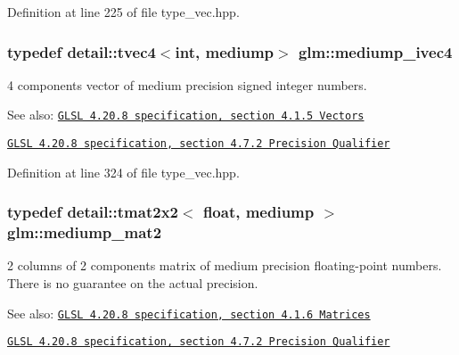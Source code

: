 Definition at line 225 of file type\_\-vec.hpp.\hypertarget{group__core__precision_ga4c23a132d76436e041747b0c03265ad}{
\subsubsection[mediump\_\-ivec4]{\setlength{\rightskip}{0pt plus 5cm}typedef detail::tvec4$<$int, mediump$>$ {\bf glm::mediump\_\-ivec4}}}
\label{group__core__precision_ga4c23a132d76436e041747b0c03265ad}


4 components vector of medium precision signed integer numbers.

\begin{Desc}
\item[See also:]\href{http://www.opengl.org/registry/doc/GLSLangSpec.4.20.8.pdf}{\tt GLSL 4.20.8 specification, section 4.1.5 Vectors} 

\href{http://www.opengl.org/registry/doc/GLSLangSpec.4.20.8.pdf}{\tt GLSL 4.20.8 specification, section 4.7.2 Precision Qualifier} \end{Desc}


Definition at line 324 of file type\_\-vec.hpp.\hypertarget{group__core__precision_g6ed8bfa67b72cea216cb558411f95f86}{
\subsubsection[mediump\_\-mat2]{\setlength{\rightskip}{0pt plus 5cm}typedef detail::tmat2x2$<$ float, mediump $>$ {\bf glm::mediump\_\-mat2}}}
\label{group__core__precision_g6ed8bfa67b72cea216cb558411f95f86}


2 columns of 2 components matrix of medium precision floating-point numbers. There is no guarantee on the actual precision.

\begin{Desc}
\item[See also:]\href{http://www.opengl.org/registry/doc/GLSLangSpec.4.20.8.pdf}{\tt GLSL 4.20.8 specification, section 4.1.6 Matrices} 

\href{http://www.opengl.org/registry/doc/GLSLangSpec.4.20.8.pdf}{\tt GLSL 4.20.8 specification, section 4.7.2 Precision Qualifier} \end{Desc}


